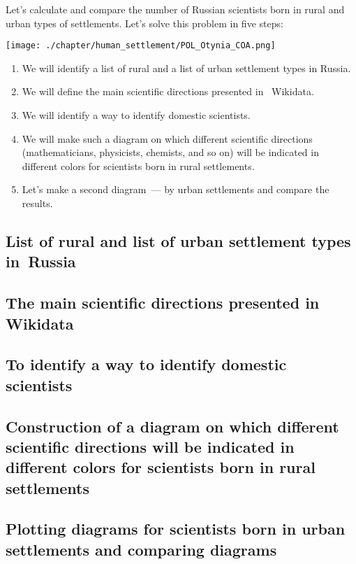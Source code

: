 Let's calculate and compare the number of Russian scientists born in rural and urban types of settlements. 
Let's solve this problem in five steps:

\begin{marginfigure} [0.0 cm]
{\texttt{[image: ./chapter/human\_settlement/POL\_Otynia\_COA.png]}}
    \caption {The coat of arms of the ``human settlement'' of which country is depicted? \newline%
See~\protect\ref{answer:flag_human_settlements} on page~\protect\pageref{answer:flag_human_settlements}.}
    \label {fig:flag_question_human_settlements4}%
\end{marginfigure}

\begin{enumerate}
\item We will identify a list of rural and a list of urban settlement types in Russia.
\item We will define the main scientific directions presented in ~Wikidata.
\item We will identify a way to identify domestic scientists.
\item We will make such a diagram on which different scientific directions (mathematicians, physicists, chemists, and so on) will be indicated in different colors for scientists born in rural settlements.
\item Let's make a second diagram~--- by urban settlements and compare the results.
\end{enumerate}

\subsection{List of rural and list of urban settlement types in~Russia}

\subsection{The main scientific directions presented in Wikidata}

\subsection{To identify a way to identify domestic scientists}

\subsection{Construction of a diagram on which different scientific directions will be indicated in different colors for scientists born in rural settlements}

\subsection{Plotting diagrams for scientists born in urban settlements and comparing diagrams}

